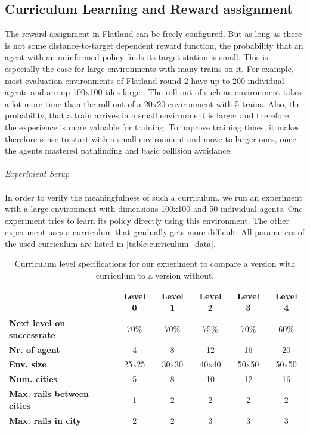 \subsection*{Curriculum Learning and Reward assignment}\label{curriculum_learning}
The reward assignment in Flatland can be freely configured. But as long as there is not some distance-to-target dependent reward function, the probability that an agent with an uninformed policy finds its target station is small. This is especially the case for large environments with many trains on it. For example, most evaluation environments of Flatland round 2 have up to 200 individual agents and are up 100x100 tiles large \cite{flatland_faq}. The roll-out of such an environment takes a lot more time than the roll-out of a 20x20 environment with 5 trains. Also, the probability, that a train arrives in a small environment is larger and therefore, the experience is more valuable for training.
To improve training times, it makes therefore sense to start with a small environment and move to larger ones, once the agents mastered pathfinding and basic collision avoidance.\\\\
\textit{Experiment Setup}\\\\
In order to verify the meaningfulness of such a curriculum, we run an experiment with a large environment with dimensions 100x100 and 50 individual agents. One experiment tries to learn its policy directly using this environment. The other experiment uses a curriculum that gradually gets more difficult. All parameters of the used curriculum are listed in \autoref{table:curriculum_data}.
\begin{table}[H]
	\centering
	\begin{tabular}{ |l|c|c|c|c|c| }
		\hline
		& \textbf{Level 0}
		& \textbf{Level 1}
		& \textbf{Level 2}
		& \textbf{Level 3}
		& \textbf{Level 4}\\
		\hline
		\textbf{Next level on successrate} & 70\% & 70\% & 75\% & 70\% & 60\% \\
		\textbf{Nr. of agent} & 4 & 8 & 12 & 16 & 20 \\
		\textbf{Env. size} & 25x25 & 30x30  & 40x40 & 50x50 & 50x50 \\
		\textbf{Num. cities} & 5 & 8 & 10  & 12 & 16 \\
		\textbf{Max. rails between cities} & 1 & 2 & 2 & 2 & 2  \\
		\textbf{Max. rails in city} & 2 & 2 & 3 & 3 & 3  \\
		\hline
	\end{tabular}
	\caption{Curriculum level specifications for our experiment to compare a version with curriculum to a version without.}
	\label{table:curriculum_data}
\end{table}
